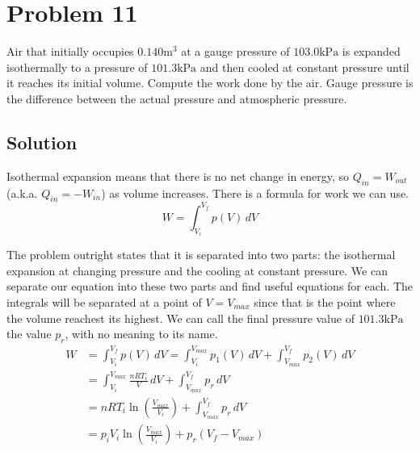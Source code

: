 \documentclass[12pt]{article}
\begin{document}
    \pagebreak
    \section{Problem 11}
        Air that initially occupies $0.140 \unit{\meter^3}$ at a gauge pressure of $103.0 \unit{\kilo\pascal}$ is expanded isothermally to a pressure of $101.3 \unit{\kilo\pascal}$ and then cooled at constant pressure until it reaches its initial volume. 
        Compute the work done by the air. 
        Gauge pressure is the difference between the actual pressure and atmospheric pressure.

        \subsection{Solution}
            Isothermal expansion means that there is no net change in energy, so $Q_{in} = W_{out}$ (a.k.a. $Q_{in} = -W_{in}$) as volume increases. 
            There is a formula for work we can use.
            \begin{equation}
                W = \int_{V_i}^{V_f} p(V)\,dV
            \end{equation}

            The problem outright states that it is separated into two parts: the isothermal expansion at changing pressure and the cooling at constant pressure.
            We can separate our equation into these two parts and find useful equations for each.
            The integrals will be separated at a point of $V = V_{max}$ since that is the point where the volume reachest its highest.
            We can call the final pressure value of $101.3 \unit{\kilo\pascal}$ the value $p_r$, with no meaning to its name.
            \begin{align}
                W   &=  \int_{V_i}^{V_f} p(V)\,dV
                    =   \int_{V_i}^{V_{max}} p_1(V)\,dV + \int_{V_{max}}^{V_f} p_2(V)\,dV\\
                    &=  \int_{V_i}^{V_{max}} \frac{nRT_i}{V} \,dV + \int_{V_{max}}^{V_f} p_r\,dV\\
                    &=  nRT_i \ln\left( \frac{V_{max}}{V_i} \right) + \int_{V_{max}}^{V_f} p_r\,dV\\
                    &=  p_i V_i \ln\left( \frac{V_{max}}{V_i} \right) + p_r (V_f - V_{max})
            \end{align}
            
\end{document}
